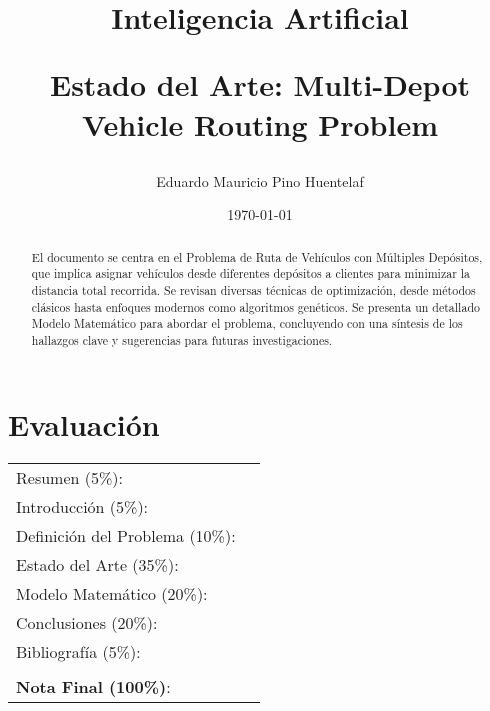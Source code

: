 \documentclass[letter, 10pt]{article}
\begin{document}
\title{Inteligencia Artificial \\ \begin{Large}Estado del Arte: Multi-Depot Vehicle Routing Problem\end{Large}}
\author{Eduardo Mauricio Pino Huentelaf}
\date{\today}
\maketitle


\section*{Evaluación}

\begin{tabular}{ll}
Resumen (5\%): & \underline{\hspace{2cm}} \\
Introducci\'on (5\%):  & \underline{\hspace{2cm}} \\
Definici\'on del Problema (10\%):  & \underline{\hspace{2cm}} \\
Estado del Arte (35\%):  & \underline{\hspace{2cm}} \\
Modelo Matem\'atico (20\%): &  \underline{\hspace{2cm}}\\
Conclusiones (20\%): &  \underline{\hspace{2cm}}\\
Bibliograf\'ia (5\%): & \underline{\hspace{2cm}}\\
 &  \\
\textbf{Nota Final (100\%)}:   & \underline{\hspace{2cm}}
\end{tabular}
\vspace{2cm}


\begin{abstract}
El documento se centra en el Problema de Ruta de Vehículos con Múltiples Depósitos, que implica asignar vehículos desde diferentes depósitos a clientes para minimizar la distancia total recorrida. Se revisan diversas técnicas de optimización, desde métodos clásicos hasta enfoques modernos como algoritmos genéticos. Se presenta un detallado Modelo Matemático para abordar el problema, concluyendo con una síntesis de los hallazgos clave y sugerencias para futuras investigaciones.
\end{abstract}
\end{document}
